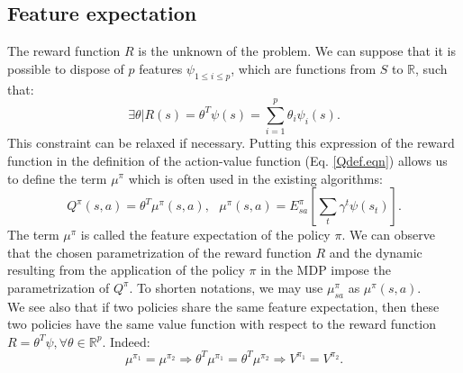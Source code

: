 \documentclass{article}
\begin{document}
\subsection{Feature expectation}
\label{ConsiderationsTechniques.sec}
The reward function $R$ is the unknown of the problem. We can suppose that it is possible to dispose of $p$ features $\psi_{1\leq i \leq p}$, which are functions from $S$ to $\mathbb{R}$, such  that:
\begin{equation}
\label{hatRdef.eqn}
\exists \theta | R(s) = \theta^T\psi(s) = \sum_{i=1}^p\theta_i\psi_i(s).
\end{equation}
This constraint can be relaxed if necessary. Putting this expression of the reward function in the definition of the action-value function (Eq. \eqref{Qdef.eqn}) allows us to define the term $\mu^\pi$ which is often used in the existing algorithms:
\begin{equation}
Q^\pi(s,a)=\theta^T\mu^\pi(s,a),\text{ }\mu^\pi(s,a) = E^\pi_{sa}[\sum_t\gamma^t\psi(s_t)].
\label{Qmu.eqn}
\end{equation}
The term $\mu^\pi$ is called the feature expectation of the policy $\pi$. We can observe that the chosen parametrization of the reward function $R$ and the dynamic resulting from the application of the policy $\pi$ in the MDP impose the parametrization of $Q^\pi$. To shorten notations, we may use $\mu^\pi_{sa}$ as $\mu^\pi(s,a)$.\\
We see also that if two policies share the same feature expectation, then these two policies have the same value function with respect to the reward function $R=\theta^T\psi,\forall \theta\in\mathbb{R}^p$. Indeed: \begin{equation}
\mu^{\pi_1} = \mu^{\pi_2} \Rightarrow \theta^T\mu^{\pi_1} = \theta^T\mu^{\pi_2} \Rightarrow V^{\pi_1} = V^{\pi_2}.
\label{memevaleur.eqn}
\end{equation}
\end{document}
